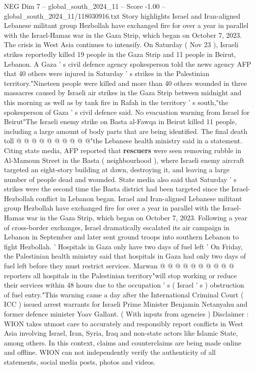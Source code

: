\begin{textsample}{NEG Dim 7 – global\_south\_2024\_11 – Score -1.00 – global\_south\_2024\_11/118030916.txt}  \label{ex:f7_neg_310}
Story highlights Israel and Iran-aligned Lebanese militant group Hezbollah have exchanged fire for over a year in parallel with the Israel-Hamas war in the Gaza Strip, which began on October 7, 2023.
The crisis in West Asia continues to intensify.
On Saturday ( Nov 23 ), Israeli strikes reportedly killed 19 people in the Gaza Strip and 11 people in Beirut, Lebanon.
A Gaza ' s civil defence agency spokesperson told the news agency AFP that 40 others were injured in Saturday ' s strikes in the Palestinian territory."Nineteen people were killed and more than 40 others wounded in three massacres caused by Israeli air strikes in the Gaza Strip between midnight and this morning as well as by tank fire in Rafah in the territory ' s south,"the spokesperson of Gaza ' s civil defence said.
No evacuation warning from Israel for Beirut"The Israeli enemy strike on Basta al-Fawqa in Beirut killed 11 people, including a large amount of body parts that are being identified.
The final death toll @ @ @ @ @ @ @ @ @ @"the Lebanese health ministry said in a statement.
Citing state media, AFP reported that \textbf{rescuers} were seen removing rubble in Al-Mamoun Street in the Basta ( neighbourhood ), where Israeli enemy aircraft targeted an eight-story building at dawn, destroying it, and leaving a large number of people dead and wounded.
State media also said that Saturday ' s strikes were the second time the Basta district had been targeted since the Israel-Hezbollah conflict in Lebanon began.
Israel and Iran-aligned Lebanese militant group Hezbollah have exchanged fire for over a year in parallel with the Israel-Hamas war in the Gaza Strip, which began on October 7, 2023.
Following a year of cross-border exchanges, Israel dramatically escalated its air campaign in Lebanon in September and later sent ground troops into southern Lebanon to fight Hezbollah. ' Hospitals in Gaza only have two days of fuel left ' On Friday, the Palestinian health ministry said that hospitals in Gaza had only two days of fuel left before they must restrict services.
Marwan @ @ @ @ @ @ @ @ @ @ reporters all hospitals in the Palestinian territory"will stop working or reduce their services within 48 hours due to the occupation ' s ( Israel ' s ) obstruction of fuel entry."This warning came a day after the International Criminal Court ( ICC ) issued arrest warrants for Israeli Prime Minister Benjamin Netanyahu and former defence minister Yoav Gallant. ( With inputs from agencies ) Disclaimer : WION takes utmost care to accurately and responsibly report conflicts in West Asia involving Israel, Iran, Syria, Iraq and non-state actors like Islamic State, among others.
In this context, claims and counterclaims are being made online and offline.
WION can not independently verify the authenticity of all statements, social media posts, photos and videos.

\end{textsample}
